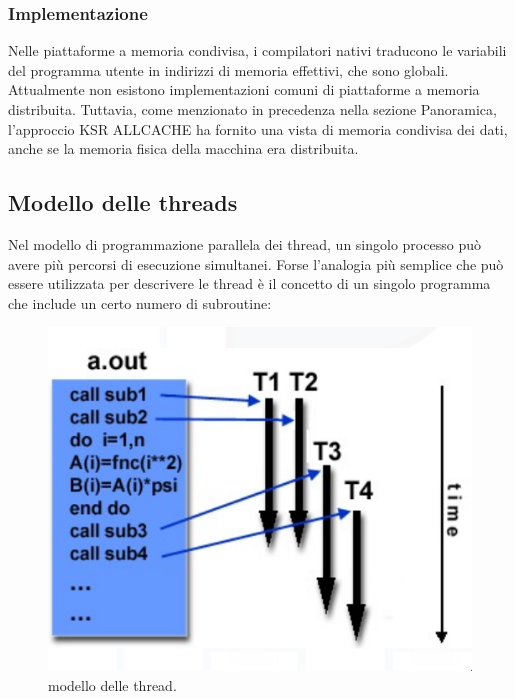 \subsubsection*{Implementazione}
Nelle piattaforme a memoria condivisa, i compilatori nativi
traducono le variabili del programma utente in indirizzi di memoria effettivi, che sono globali.
Attualmente non esistono implementazioni comuni di piattaforme a memoria distribuita. Tuttavia, come menzionato in precedenza nella sezione Panoramica,
l'approccio KSR ALLCACHE ha fornito una vista di memoria condivisa dei dati, anche se la memoria fisica della
macchina era distribuita.
\subsection{Modello delle threads}

Nel modello di programmazione parallela dei thread, un singolo processo può avere più percorsi di esecuzione simultanei. Forse l'analogia più semplice che può essere utilizzata per descrivere le thread è il concetto di un singolo programma che include un certo numero di subroutine:
\begin{figure}[th]
	\centering
	\includegraphics[width=0.4\linewidth]{img/modello-thread}
	\caption{modello delle thread.}
	\label{fig:modello-thread}
\end{figure}

